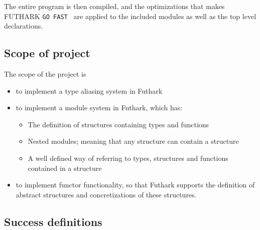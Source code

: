 The entire program is then compiled, and the optimizations that makes FUTHARK \texttt{GO
FAST } are applied to the included modules as well as the top level declarations.

\subsection{Scope of project}
\label{subsec:project_scope}
The scope of the project is
\begin{itemize}
  \item to implement a type aliasing system in Futhark
  \item to implement a module system in Futhark, which has:
    \begin{itemize}
      \item The definition of structures containing types and functions
      \item Nested modules; meaning that any structure can contain a structure
      \item A well defined way of referring to types, structures and functions
        contained in a structure
    \end{itemize}
  \item to implement functor functionality, so that Futhark supports the
    definition of abstract structures and concretizations of these structures.
\end{itemize}

\subsection{Success definitions}
\label{subsec:label}

